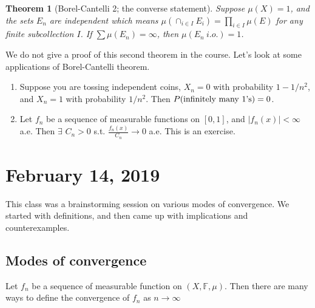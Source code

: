 \documentclass{article}
\newtheorem{theorem}{Theorem}[section]
\theoremstyle{definition}
\begin{document}
\begin{theorem}[Borel-Cantelli 2; the converse statement]
	Suppose $\mu(X)=1$, and the sets $E_n$ are independent which means
	$\mu(\cap_{i\in I} E_i)=\prod_{i\in I} \mu(E)$ for any finite subcollection $I$.
	If
	$\sum \mu(E_n)=\infty$, then  $\mu(E_n \ i.o.)=1$.
\end{theorem}
We do not give a proof of this second theorem
in the course.
Let's look at some applications of Borel-Cantelli theorem.
\begin{enumerate}
	\item Suppose you are tossing independent coins, 
		$X_n=0$ with probability $1-1/n^2$,
		and $X_n=1$ with probability $1/n^2$.
		Then $P(\textnormal{infinitely many $1$'s})=0$.
	
	\item Let $f_n$ be a sequence of measurable functions on $[0,1]$, and $|f_n(x)|<\infty$ a.e.
		Then $\exists$ $C_n>0$ s.t. $\frac{f_n(x)}{C_n} \rightarrow 0$ a.e.
		This is an exercise.
\end{enumerate}

\section{February 14, 2019}

This class was a brainstorming session 
on various modes of convergence. 
We started with definitions, and then 
came up with implications and counterexamples.

\subsection{Modes of convergence}

Let $f_n$ be a sequence of measurable function on $(X,\mathbb{F},\mu)$. Then there are many ways to define the convergence of $f_n$ as $n\rightarrow \infty$
\end{document}
